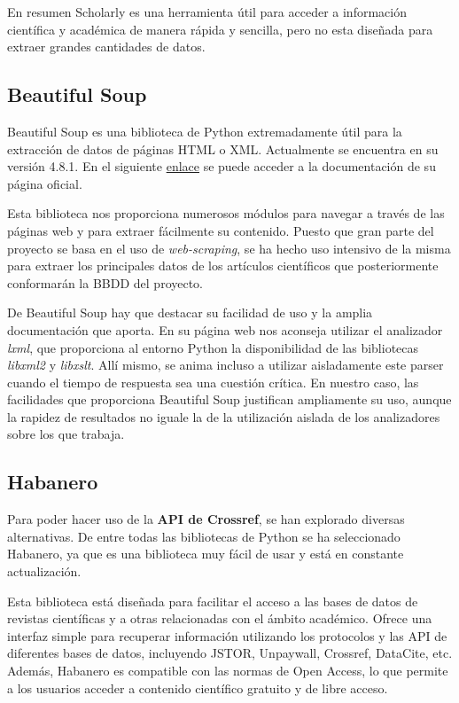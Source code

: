 En resumen Scholarly es una herramienta útil para acceder a información científica y académica de manera rápida y sencilla, pero no esta diseñada para extraer grandes cantidades de datos.

\subsection{Beautiful Soup}
Beautiful Soup es una biblioteca de Python extremadamente útil para la extracción de datos de páginas HTML o XML. Actualmente se encuentra en su versión 4.8.1. En el siguiente \href{https://beautiful-soup-4.readthedocs.io/en/latest/}{enlace} se puede acceder a la documentación de su página oficial. 

Esta biblioteca nos proporciona numerosos módulos para navegar a través de las páginas web y para extraer fácilmente su contenido. Puesto que gran parte del proyecto se basa en el uso de \textit{web-scraping}, se ha hecho uso intensivo de la misma para extraer los principales datos de los artículos científicos que posteriormente conformarán la BBDD del proyecto.

De Beautiful Soup hay que destacar su facilidad de uso y la amplia documentación que aporta. En su página web nos aconseja utilizar el analizador \textit{lxml}, que proporciona al entorno Python la disponibilidad de las bibliotecas \textit{libxml2} y \textit{libxslt}. Allí mismo, se anima incluso a utilizar aisladamente este parser cuando el tiempo de respuesta sea una cuestión crítica. En nuestro caso, las facilidades que proporciona Beautiful Soup justifican ampliamente su uso, aunque la  rapidez de resultados no iguale la de la utilización aislada de los analizadores sobre los que trabaja.
 

\subsection{Habanero}
Para poder hacer uso de la \textbf{API de Crossref}, se han explorado diversas alternativas. De entre todas las bibliotecas de Python se ha seleccionado Habanero, ya que es una biblioteca muy fácil de usar y está en constante actualización.

Esta biblioteca está diseñada para facilitar el acceso a las bases de datos de revistas científicas y a otras relacionadas con el ámbito académico. Ofrece una interfaz simple para recuperar información utilizando los protocolos y las API de diferentes bases de datos, incluyendo JSTOR, Unpaywall, Crossref, DataCite, etc. Además, Habanero es compatible con las normas de Open Access, lo que permite a los usuarios acceder a contenido científico gratuito y de libre acceso.

